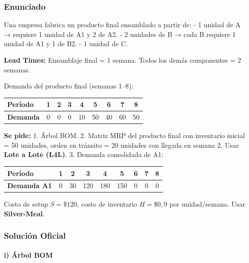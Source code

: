 \documentclass[
]{article}
\begin{document}
\hypertarget{enunciado-1}{%
\subsubsection{Enunciado}\label{enunciado-1}}

Una empresa fabrica un producto final ensamblado a partir de: - 1 unidad
de A → requiere 1 unidad de A1 y 2 de A2. - 2 unidades de B → cada B
requiere 1 unidad de A1 y 1 de B2. - 1 unidad de C.

\textbf{Lead Times:} Ensamblaje final = 1 semana. Todos los demás
componentes = 2 semanas.

Demanda del producto final (semanas 1--8):

\begin{longtable}[]{@{}lcccccccc@{}}
\toprule\noalign{}
Período & 1 & 2 & 3 & 4 & 5 & 6 & 7 & 8 \\
\midrule\noalign{}
\endhead
\bottomrule\noalign{}
\endlastfoot
\textbf{Demanda} & 0 & 0 & 0 & 10 & 50 & 40 & 60 & 50 \\
\end{longtable}

\textbf{Se pide:} 1. Árbol BOM. 2. Matriz MRP del producto final con
inventario inicial = 50 unidades, orden en tránsito = 20 unidades con
llegada en semana 2. Usar \textbf{Lote a Lote (L4L)}. 3. Demanda
consolidada de A1:

\begin{longtable}[]{@{}lcccccccc@{}}
\toprule\noalign{}
Período & 1 & 2 & 3 & 4 & 5 & 6 & 7 & 8 \\
\midrule\noalign{}
\endhead
\bottomrule\noalign{}
\endlastfoot
\textbf{Demanda A1} & 0 & 30 & 120 & 180 & 150 & 0 & 0 & 0 \\
\end{longtable}

Costo de setup \(S = \$120\), costo de inventario \(H = \$0{,}9\) por
unidad/semana. Usar \textbf{Silver-Meal}.

\hypertarget{soluciuxf3n-oficial-1}{%
\subsubsection{Solución Oficial}\label{soluciuxf3n-oficial-1}}

\hypertarget{i-uxe1rbol-bom}{%
\paragraph{i) Árbol BOM}\label{i-uxe1rbol-bom}}
\end{document}
